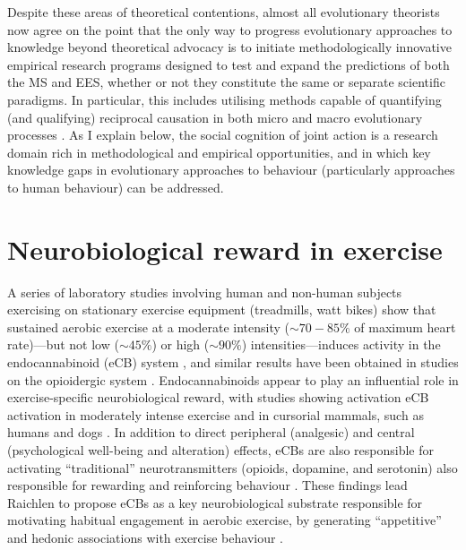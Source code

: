 Despite these areas of theoretical contentions, almost all evolutionary theorists now agree on the point that the only way to progress evolutionary approaches to knowledge beyond theoretical advocacy is to initiate methodologically innovative empirical research programs designed to test and expand the predictions of both the MS and EES, whether or not they constitute the same or separate scientific paradigms.  In particular, this includes utilising methods capable of quantifying (and qualifying) reciprocal causation in both micro and macro evolutionary processes  \citep{Wray2014,Laland2014,Laland2015,Svensson2017}.  As I explain below, the social cognition of joint action is a research domain rich in methodological and empirical opportunities, and in which key knowledge gaps in evolutionary approaches to behaviour (particularly approaches to human behaviour) can be addressed.












\section{Neurobiological reward in exercise\label{sect:neuroRewardGE}}
A series of laboratory studies involving human and non-human subjects exercising on stationary exercise equipment (treadmills, watt bikes) show that sustained aerobic exercise at a moderate intensity ($\sim70-85\%$ of maximum heart rate)---but not low ($\sim45\%$) or high ($\sim90\%$) intensities---induces activity in the endocannabinoid (eCB) system \citep{Raichlen2013}, and similar results have been obtained in studies on the opioidergic system \citep{Boecker2008}.  Endocannabinoids appear to play an influential role in exercise-specific neurobiological reward, with studies showing activation eCB activation in moderately intense exercise and in cursorial mammals, such as humans and dogs \citep[but not non-cursorial mammals, e.g., ferrets;][]{Raichlen2012}.  In addition to direct peripheral (analgesic) and central (psychological well-being and alteration) effects, eCBs are also responsible for activating ``traditional'' neurotransmitters (opioids, dopamine, and serotonin) also responsible for rewarding and reinforcing behaviour \citep{Sparling2003}.  These findings lead Raichlen to propose eCBs as a key neurobiological substrate responsible for motivating habitual engagement in aerobic exercise, by generating ``appetitive'' and hedonic associations with exercise behaviour \citep{Raichlen2012}.








